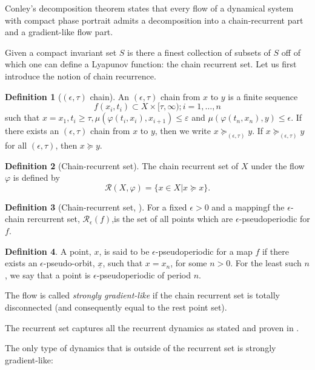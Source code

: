 \documentclass{scrartcl}
\theoremstyle{definition}
\newtheorem{definition}{Definition}
\theoremstyle{remark}
\begin{document}
Conley's decomposition theorem states that every flow of a dynamical system with compact phase portrait admits a decomposition into a chain-recurrent part and a gradient-like flow part.


Given a compact invariant set $S$ is there a finest collection of subsets of $S$ off of which one can define a Lyapunov function: the chain recurrent set. Let us first introduce the notion of chain recurrence.

\begin{definition}[$(\epsilon,\tau)$ chain]
An $(\epsilon,\tau)$ chain from $x$ to $y$ is a finite sequence 
\[f(x_i, t_i) \subset  X \times  [\tau,\infty); i = 1, \dots, n\]
such that $x = x_1, t_i\geq \tau, \mu(\varphi(t_i, x_i), x_{i+1})\leq \varepsilon$   and $\mu(\varphi(t_n, x_n), y)\leq \epsilon$.
 If there exists an $(\epsilon,\tau)$ chain from $x$ to $y$, then we write $x \succeq_{(\epsilon,\tau)}y$. If  $x \succeq_{(\epsilon,\tau)}y$ for all $(\epsilon,\tau)$, then  $x \succeq y$.
\end{definition}


\begin{definition}[Chain-recurrent set]
The chain recurrent set of $X$ under the flow $\varphi$ is defined by 
\[\mathcal{R}(X,\varphi) = \{x\in X|x\succeq x\}.\]
\end{definition}

\begin{definition}[Chain-recurrent set, \citep{casey1996}]
For a fixed $\epsilon > 0$ and a mappingf the $\epsilon$-chain rercurrent set, $\mathcal{R}_\epsilon(f)$,is the set of all points which are $\epsilon$-pseudoperiodic for $f$.
\end{definition}

\begin{definition}
A point, $x$, is said to be  $\epsilon$-pseudoperiodic for a map $f$ if there exists an $\epsilon$-pseudo-orbit, $\underline{x}$, such that $x = x_n$, for some $n > 0$.
 For the least such $n$, we say that a point is $\epsilon$-pseudoperiodic of period $n$.
\end{definition}


The flow is called \emph{strongly gradient-like} if the chain recurrent set is totally disconnected (and consequently equal to the rest point set). 

The recurrent set captures all the recurrent dynamics as stated and proven in \citep[Chapter I.8.2]{conley1978}.

The only type of dynamics that is outside of the recurrent set is strongly gradient-like:
\end{document}
